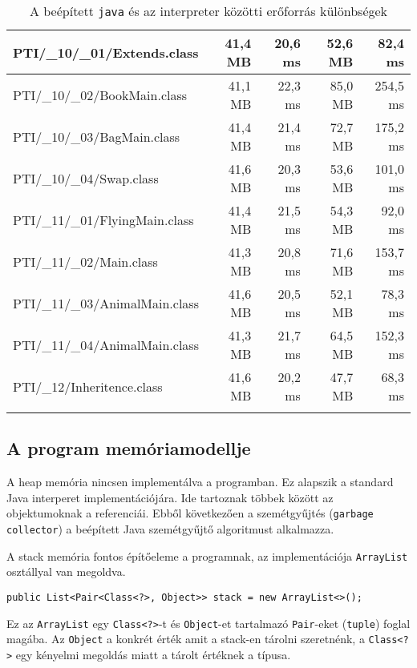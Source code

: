 \begin{center}
\begin{longtable}{ | l | r | r | r | r | }
		\hline
		PTI/\_10/\_01/Extends.class & 41,4 MB & 20,6 ms & 52,6 MB & 82,4 ms \\
		\hline
		PTI/\_10/\_02/BookMain.class & 41,1 MB & 22,3 ms & 85,0 MB & 254,5 ms \\
		\hline
		PTI/\_10/\_03/BagMain.class & 41,4 MB & 21,4 ms & 72,7 MB & 175,2 ms \\
		\hline
		PTI/\_10/\_04/Swap.class & 41,6 MB & 20,3 ms & 53,6 MB & 101,0 ms \\
		\hline
		PTI/\_11/\_01/FlyingMain.class & 41,4 MB & 21,5 ms & 54,3 MB & 92,0 ms \\
		\hline
		PTI/\_11/\_02/Main.class & 41,3 MB & 20,8 ms & 71,6 MB & 153,7 ms \\
		\hline
		PTI/\_11/\_03/AnimalMain.class & 41,6 MB & 20,5 ms & 52,1 MB & 78,3 ms \\
		\hline
		PTI/\_11/\_04/AnimalMain.class & 41,3 MB & 21,7 ms & 64,5 MB & 152,3 ms \\
		\hline
		PTI/\_12/Inheritence.class & 41,6 MB & 20,2 ms & 47,7 MB & 68,3 ms \\
		\hline

		\caption[Erőforrás különbségek]{A beépített \lstinline{java} és az interpreter közötti erőforrás különbségek}
		\label{jabyinja:resource}
	\end{longtable}
\end{center}

\subsection{A program memóriamodellje}

A heap memória nincsen implementálva a programban. Ez alapszik a standard Java interperet implementációjára. Ide tartoznak többek között az objektumoknak a referenciái. Ebből következően a szemétgyűjtés (\lstinline{garbage collector}) a beépített Java szemétgyűjtő algoritmust alkalmazza.

A stack memória fontos építőeleme a programnak, az implementációja \lstinline{ArrayList} osztállyal van megoldva.
\begin{verbatim}
public List<Pair<Class<?>, Object>> stack = new ArrayList<>();
\end{verbatim}
Ez az \lstinline{ArrayList} egy \lstinline{Class<?>}-t és \lstinline{Object}-et tartalmazó \lstinline{Pair}-eket (\lstinline{tuple}) foglal magába. Az \lstinline{Object} a konkrét érték amit a stack-en tárolni szeretnénk, a \lstinline{Class<?>} egy kényelmi megoldás miatt a tárolt értéknek a típusa.

